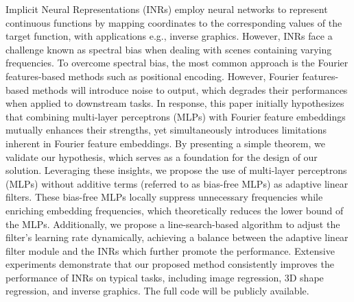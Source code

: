 Implicit Neural Representations (INRs) employ neural networks to represent continuous functions by mapping coordinates to the corresponding values of the target function, with applications e.g., inverse graphics. 
%
However, INRs face a challenge known as spectral bias when dealing with scenes containing varying frequencies.
%
To overcome spectral bias, the most common approach is the Fourier features-based methods such as positional encoding.
%
However, Fourier features-based methods will introduce noise to output, which degrades their performances when applied to downstream tasks.
%
In response, this paper initially hypothesizes that combining multi-layer perceptrons (MLPs) with Fourier feature embeddings mutually enhances their strengths, yet simultaneously introduces limitations inherent in Fourier feature embeddings.
%
By presenting a simple theorem, we validate our hypothesis, which serves as a foundation for the design of our solution.
%
Leveraging these insights, we propose the use of multi-layer perceptrons (MLPs) without additive terms (referred to as bias-free MLPs) as adaptive linear filters. These bias-free MLPs locally suppress unnecessary frequencies while enriching embedding frequencies, which theoretically reduces the lower bound of the MLPs.
%
Additionally, we propose a line-search-based algorithm to adjust the filter's learning rate dynamically, achieving a balance between the adaptive linear filter module and the INRs which further promote the performance.
%
Extensive experiments demonstrate that our proposed method consistently improves the performance of INRs on typical tasks, including image regression, 3D shape regression, and inverse graphics. The full code will be publicly available.